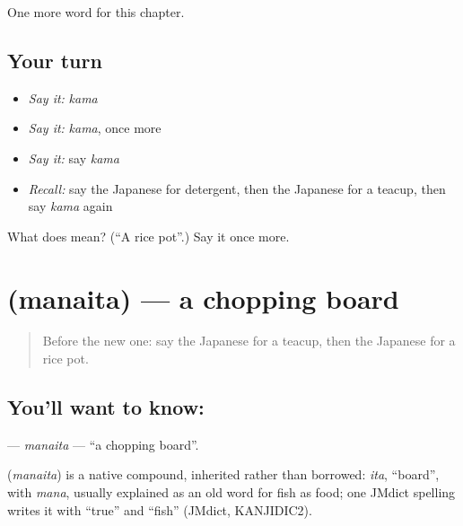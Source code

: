 \begin{grammarlens}[title={What you've built}]
One more word for this chapter.
\end{grammarlens}

\subsection*{Your turn}
\begin{itemize}
\raggedright
  \item \emph{Say it:} \emph{kama}
  \item \emph{Say it:} \emph{kama}, once more
  \item \emph{Say it:} say \emph{kama}
  \item \emph{Recall:} say the Japanese for detergent, then the Japanese for a teacup, then say \emph{kama} again
\end{itemize}

\begin{tcolorbox}[breakable,colback=teal!4,colframe=teal!35!black,title={Before you move on}]
What does  mean? (\textquotedblleft{}A rice pot\textquotedblright{}.) Say it once more.
\end{tcolorbox}
\section[\texorpdfstring{\ja{まないた} (manaita)}{まないた (manaita)}]{ (manaita) — a chopping board}

\label{lesson:JA-C102-manaita}



\begin{quote}
Before the new one: say the Japanese for a teacup, then the Japanese for a rice pot.
\end{quote}

\subsection*{You'll want to know: }
\textbf{} — \emph{manaita} — \textquotedblleft{}a chopping board\textquotedblright{}.

\begin{cousinweb}
\textbf{} (\emph{manaita}) is a native compound, inherited rather than borrowed: \emph{ita}, \textquotedblleft{}board\textquotedblright{}, with \emph{mana}, usually explained as an old word for fish as food; one JMdict spelling writes it with \textquotedblleft{}true\textquotedblright{} and \textquotedblleft{}fish\textquotedblright{} (JMdict, KANJIDIC2).
\end{cousinweb}


